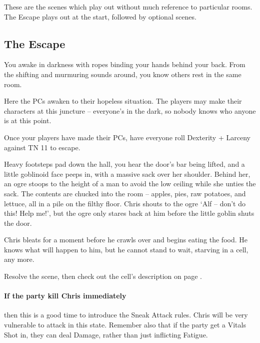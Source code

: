 
\begin{multicols}{2}

These are the scenes which play out without much reference to particular rooms.
The Escape plays out at the start, followed by optional scenes.

\subsection{The Escape}
\label{escape}

\begin{boxtext}

	You awake in darkness with ropes binding your hands behind your back.
	From the shifting and murmuring sounds around, you know others rest in the same room.

\end{boxtext}

Here the PCs awaken to their hopeless situation.
The players may make their characters at this juncture -- everyone's in the dark, so nobody knows who anyone is at this point.

Once your players have made their PCs, have everyone roll Dexterity + Larceny against TN 11 to escape.

\begin{boxtext}

	Heavy footsteps pad down the hall, you hear the door's bar being lifted, and a little goblinoid face peeps in, with a massive sack over her shoulder.
	Behind her, an ogre stoops to the height of a man to avoid the low ceiling while she unties the sack.
	The contents are chucked into the room -- apples, pies, raw potatoes, and lettuce, all in a pile on the filthy floor.
	Chris shouts to the ogre `Alf -- don't do this! Help me!', but the ogre only stares back at him before the little goblin shuts the door.

\end{boxtext}

Chris bleats for a moment before he crawls over and begins eating the food.
He knows what will happen to him, but he cannot stand to wait, starving in a cell, any more.

Resolve the scene, then check out the cell's description on page \pageref{entrycell}.

\paragraph{If the party kill Chris immediately}
then this is a good time to introduce the Sneak Attack rules.
Chris will be very vulnerable to attack in this state.
Remember also that if the party get a Vitals Shot in, they can deal Damage, rather than just inflicting Fatigue.


\end{multicols}
